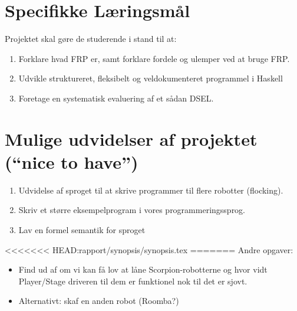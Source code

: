 \documentclass[a4paper,oneside, draft]{memoir}
\begin{document}
\section{Specifikke Læringsmål}

Projektet skal gøre de studerende i stand til at:

\begin{enumerate}

\item Forklare hvad FRP er, samt forklare fordele og ulemper ved at bruge FRP.

\item Udvikle struktureret, fleksibelt og veldokumenteret programmel i Haskell


\item Foretage en systematisk evaluering af et sådan DSEL.

\end{enumerate}


\section{Mulige udvidelser af projektet ("`nice to have"')}
\begin{enumerate}

\item Udvidelse af sproget til at skrive programmer til flere robotter (flocking).

\item Skriv et større eksempelprogram i vores programmeringssprog.

\item Lav en formel semantik for sproget

\end{enumerate}

<<<<<<< HEAD:rapport/synopsis/synopsis.tex
=======
\noindent
Andre opgaver:
\begin{itemize}
\item Find ud af om vi kan få lov at låne Scorpion-robotterne og hvor
  vidt Player/Stage driveren til dem er funktionel nok til det er sjovt.
\item Alternativt: skaf en anden robot (Roomba?)
\end{itemize}
\end{document}
